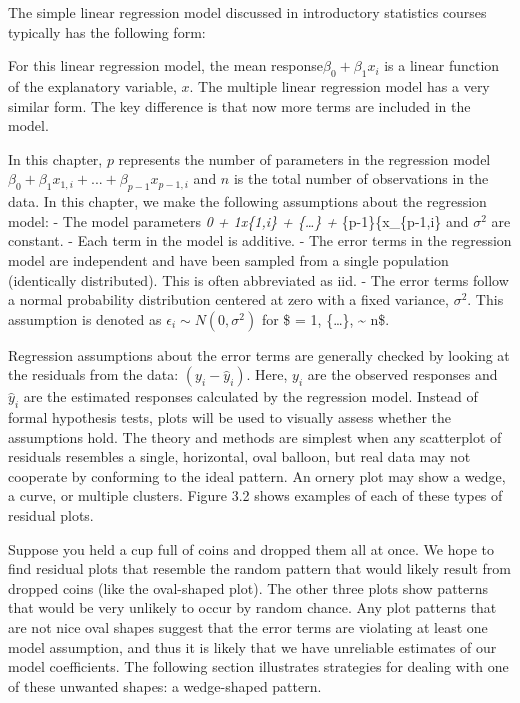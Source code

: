 \documentclass[
]{report}
\begin{document}
The simple linear regression model discussed in introductory statistics courses typically has the following form:

For this linear regression model, the mean response\(\beta_0 + \beta_1x_i\) is a linear function of the explanatory variable, \(x\). The multiple linear regression model has a very similar form. The key difference is that now more terms are included in the model.

In this chapter, \(p\) represents the number of parameters in the regression model \(\beta_0 + \beta_1x_{1,i} + {...} + \beta_{p-1}x_{p-1,i}\) and \(n\) is the total number of observations in the data. In this chapter, we make the following assumptions
about the regression model:
- The model parameters \beta\emph{0 + \beta\emph{1x}\{1,i\} + \{\ldots\} + \beta}\{p-1\}\{x\_\{p-1,i\} and \(\sigma^2\) are constant.
- Each term in the model is additive.
- The error terms in the regression model are independent and have been sampled from a single population (identically distributed). This is often abbreviated as iid.
- The error terms follow a normal probability distribution centered at zero with a fixed variance, \(\sigma^2\). This assumption is denoted as \(\epsilon_i \sim N(0,\sigma^2)\) for \$ = 1, \{\ldots\}, \textasciitilde{} n\$.

Regression assumptions about the error terms are generally checked by looking at the residuals from the data: \(({y}_i - \hat{y}_i)\). Here, \(y_i\) are the observed responses and \(\hat{y}_i\) are the estimated responses calculated by the regression model. Instead of formal hypothesis tests, plots will be used to visually assess whether the assumptions hold. The theory and methods are simplest when any scatterplot of residuals resembles a
single, horizontal, oval balloon, but real data may not cooperate by conforming to the ideal pattern. An ornery plot may show a wedge, a curve, or multiple clusters. Figure 3.2 shows examples of each of these types of residual plots.

Suppose you held a cup full of coins and dropped them all at once. We hope to find residual plots that resemble the random pattern that would likely result from dropped coins (like the oval-shaped plot). The other three plots show patterns that would be very unlikely to occur by random chance. Any plot patterns that are not nice oval shapes suggest that the error terms are violating at least one model assumption, and thus it is
likely that we have unreliable estimates of our model coefficients. The following section illustrates strategies for dealing with one of these unwanted shapes: a wedge-shaped pattern.
\end{document}

